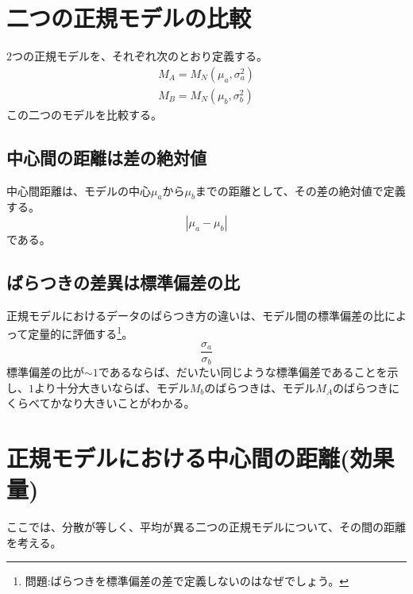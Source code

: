 
\section{二つの正規モデルの比較}
$2$つの正規モデルを、それぞれ次のとおり定義する。
\begin{eqnarray*}
 M_A = M_N(\mu_a,\sigma_a^2) \\
 M_B = M_N(\mu_b,\sigma_b^2)
\end{eqnarray*}
この二つのモデルを比較する。

\subsection{中心間の距離は差の絶対値}
中心間距離は、モデルの中心$\mu_a$から$\mu_b$までの距離として、その差の絶対値で定義する。
\begin{equation*}
 |\mu_a - \mu_b|
\end{equation*}
である。

\subsection{ばらつきの差異は標準偏差の比}
正規モデルにおけるデータのばらつき方の違いは、モデル間の標準偏差の比によって定量的に評価する\footnote{問題:ばらつきを標準偏差の差で定義しないのはなぜでしょう。}。
\begin{equation*}
 \frac{\sigma_a}{\sigma_b}
\end{equation*}
標準偏差の比が$\sim 1$であるならば、だいたい同じような標準偏差であることを示し、$1$より十分大きいならば、モデル$M_b$のばらつきは、モデル$M_A$のばらつきにくらべてかなり大きいことがわかる。

\section{正規モデルにおける中心間の距離(効果量)}
ここでは、分散が等しく、平均が異る二つの正規モデルについて、その間の距離を考える。

